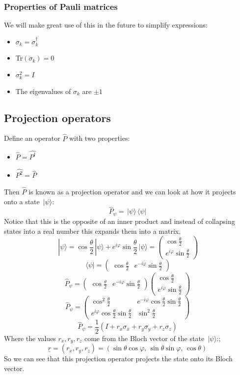 \documentclass[12pt]{article}
\newcommand{\ket}[1]{\,|#1\rangle}
\newcommand{\bra}[1]{\,\langle #1|}
\begin{document}
\subsubsection*{Properties of Pauli matrices}
We will make great use of this in the future to simplify expressions:
\begin{itemize}
    \item \(\sigma_k=\sigma_k^\dagger\)
    \item Tr\((\sigma_k)=0\)
    \item \(\sigma_k^2=I\)
    \item The eigenvalues of \(\sigma_k\) are \(\pm1\)
\end{itemize}
\subsection*{Projection operators}
Define an operator \(\hat{P}\) with two properties:
\begin{itemize}
    \item \(\hat{P}=\hat{P^\dagger}\)
    \item \(\hat{P^2}=\hat{P}\)
\end{itemize}
Then \(\hat{P}\) is known as a projection operator and we can look at how it projects onto a state \(\ket{\psi}\):
\[\hat{P}_\psi=\ket{\psi}\bra{\psi}\]
Notice that this is the opposite of an inner product and instead of collapsing states into a real number this expands them into a matrix.
\[\ket{\psi}=\cos{\frac{\theta}{2}}\ket{\psi}+e^{i\varphi}\sin{\frac{\theta}{2}}\ket{\psi}=\begin{pmatrix}
    \cos\frac{\theta}{2} \\
    e^{i\varphi}\sin{\frac{\theta}{2}}
\end{pmatrix}\]
\[\bra{\psi}=\begin{pmatrix}
    \cos{\frac{\theta}{2}} & e^{-i\varphi}\sin{\frac{\theta}{2}}
\end{pmatrix}\]
\[\hat{P}_\psi=\begin{pmatrix}
    \cos{\frac{\theta}{2}} & e^{-i\varphi}\sin{\frac{\theta}{2}}
\end{pmatrix}\begin{pmatrix}
    \cos\frac{\theta}{2} \\
    e^{i\varphi}\sin{\frac{\theta}{2}}
\end{pmatrix}\]
\[\hat{P}_\psi=\begin{pmatrix}
    \cos^2\frac{\theta}{2} & e^{-i\varphi}\cos\frac{\theta}{2}\sin\frac{\theta}{2} \\
     e^{i\varphi}\cos\frac{\theta}{2}\sin\frac{\theta}{2} & \sin^2\frac{\theta}{2}
\end{pmatrix}\]
\[\hat{P}_\psi=\frac{1}{2}(I+r_x\sigma_x+r_y\sigma_y+r_z\sigma_z)\]
Where the values \(r_x,r_y,r_z\) come from the Bloch vector of the state \(\ket{\psi}\):;
\[\underline{r}=(r_x,r_y,r_z)=(\sin\theta\cos\varphi,\,\sin\theta\sin\varphi,\,\cos\theta)\]
So we can see that this projection operator projects the state onto its Bloch vector.
\end{document}
